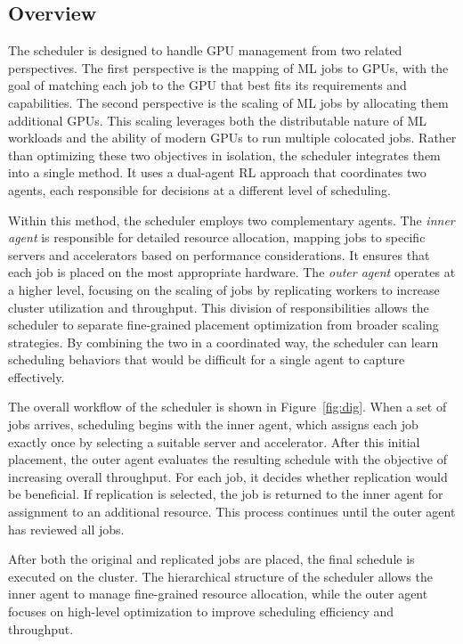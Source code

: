 \documentclass{article}
\begin{document}
\subsection{Overview}
\label{sec:over}
The scheduler is designed to handle GPU management from two related perspectives. The first perspective is the mapping of ML jobs to GPUs, with the goal of matching each job to the GPU that best fits its requirements and capabilities. The second perspective is the scaling of ML jobs by allocating them additional GPUs. This scaling leverages both the distributable nature of ML workloads and the ability of modern GPUs to run multiple colocated jobs. Rather than optimizing these two objectives in isolation, the scheduler integrates them into a single method. It uses a dual-agent RL approach that coordinates two agents, each responsible for decisions at a different level of scheduling.

Within this method, the scheduler employs two complementary agents. The \emph{inner agent} is responsible for detailed resource allocation, mapping jobs to specific servers and accelerators based on performance considerations. It ensures that each job is placed on the most appropriate hardware. The \emph{outer agent} operates at a higher level, focusing on the scaling of jobs by replicating workers to increase cluster utilization and throughput. This division of responsibilities allows the scheduler to separate fine-grained placement optimization from broader scaling strategies. By combining the two in a coordinated way, the scheduler can learn scheduling behaviors that would be difficult for a single agent to capture effectively.

The overall workflow of the scheduler is shown in Figure~\ref{fig:dig}. When a set of jobs arrives, scheduling begins with the inner agent, which assigns each job exactly once by selecting a suitable server and accelerator. After this initial placement, the outer agent evaluates the resulting schedule with the objective of increasing overall throughput. For each job, it decides whether replication would be beneficial. If replication is selected, the job is returned to the inner agent for assignment to an additional resource. This process continues until the outer agent has reviewed all jobs.

After both the original and replicated jobs are placed, the final schedule is executed on the cluster. The hierarchical structure of the scheduler allows the inner agent to manage fine-grained resource allocation, while the outer agent focuses on high-level optimization to improve scheduling efficiency and throughput.
 
\end{document}
